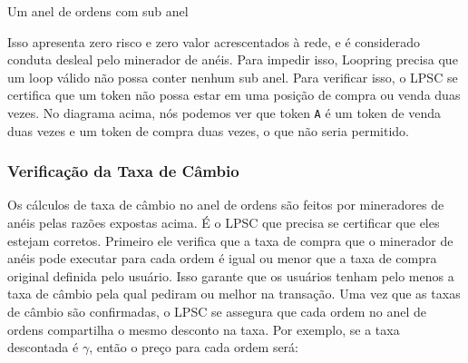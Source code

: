 \documentclass[UTF8,nofonts]{article}
\makeatletter
\newenvironment{figurehere}
 {\def\@captype{figure}}
 {}
\makeatother
\begin{document}
\begin{multicols}{2}
\begin{center}
\begin{figurehere}

\caption{Um anel de ordens com sub anel}
\label{fig:subring}
\end{figurehere}
\end{center}

Isso apresenta zero risco e zero valor acrescentados à rede, e é considerado conduta desleal pelo minerador de anéis. Para impedir isso, Loopring precisa que um loop válido não possa conter nenhum sub anel. Para verificar isso, o LPSC se certifica que um token não possa estar em uma posição de compra ou venda duas vezes. No diagrama acima, nós podemos ver que token \verb|A| é um token de venda duas vezes e um token de compra duas vezes, o que não seria permitido.

\subsubsection{Verificação da Taxa de Câmbio\label{sec:fill_rate_check}}

Os cálculos de taxa de câmbio no anel de ordens são feitos por mineradores de anéis pelas razões expostas acima. É o LPSC que precisa se certificar que eles estejam corretos.  Primeiro  ele verifica que a taxa de compra que o minerador de anéis pode executar para cada ordem é igual ou menor que a taxa de compra original definida pelo usuário. Isso garante que os usuários tenham pelo menos a taxa de câmbio pela qual pediram ou melhor na transação. Uma vez que as taxas de câmbio são confirmadas, o LPSC se assegura que cada ordem no anel de ordens  compartilha o mesmo desconto na taxa. Por exemplo, se a taxa descontada é $\gamma$, então o preço para cada ordem será:


\end{multicols}
\end{document}
